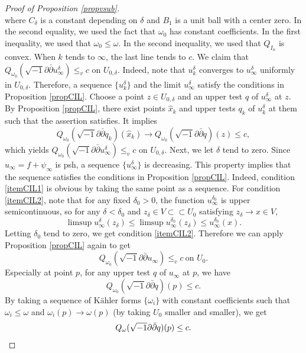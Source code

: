 \documentclass{amsart}
\numberwithin{equation}{section}
\theoremstyle{plain}
\theoremstyle{definition}
\theoremstyle{remark}
\newcommand{\delb}{\sqrt{-1}\partial\bar{\partial}}
\begin{document}
\begin{proof}[Proof of Proposition \ref{propvsub}]
\begin{equation}
    \end{equation}
    where $C_\delta$ is a constant depending on $\delta$ and $B_1$ is a unit ball with a center zero. In the second equality, we used the fact that $\omega_0$ has constant coefficients. In the first inequality, we used that $\omega_0\le \omega$. In the second inequality, we used that $Q_{I_n}$ is convex. When $k$ tends to $\infty$, the last line tends to $c$. We claim that $Q_{\omega_0}(\delb u^\delta_\infty)\le_v c$ on $U_{0,\delta}$. Indeed, note that $u^\delta_k$ converges to $u^\delta_\infty$ uniformly in $U_{0,\delta}$. Therefore, a sequence $\{ u^\delta_k\}$ and the limit $u^\delta_\infty$ satisfy the conditions in Proposition \ref{propCIL}. Choose a point $z \in U_{0,\delta}$ and an upper test $q$ of $u^\delta_\infty$ at $z$. By Proposition \ref{propCIL}, there exist points $\hat{x}_k$ and upper tests $q_k$ of $u^\delta_k$ at them such that the assertion satisfies. It implies 
    $$Q_{\omega_0}(\delb q_k)(\hat{x}_k) \rightarrow Q_{\omega_0}(\delb q)(z) \le c,$$
    which yields $Q_{\omega_0}(\delb u^\delta_\infty)\le_v c$ on $U_{0,\delta}$.
    Next, we let $\delta$ tend to zero. Since $u_\infty = f + \psi_\infty$ is psh, a sequence $\{ u^\delta_\infty \}$ is decreasing. This property implies that the sequence satisfies the conditions in Proposition \ref{propCIL}. 
    Indeed, condition \ref{itemCIL1} is obvious by taking the same point as a sequence. For condition \ref{itemCIL2}, note that for any fixed $\delta_0>0$, the function $u^{\delta_0}_\infty$ is upper semicontinuous, so for any $\delta < \delta_0$ and $z_\delta \in V \subset\subset U_0$ satisfying $z_\delta \rightarrow x \in V$,
    $$\limsup{u^\delta_\infty}(z_\delta)\le \limsup{u^{\delta_0}_\infty}(z_\delta) \le u^{\delta_0}_\infty(x).$$
    Letting $\delta_0$ tend to zero, we get condition \ref{itemCIL2}. Therefore we can apply Proposition \ref{propCIL} again to get
    $$Q_{\omega_0}(\delb u_\infty) \le_v c \ \text{on $U_0$}.$$
    Especially at point $p$, for any upper test $q$ of $u_\infty$ at $p$, we have
    $$Q_{\omega_0}(\delb q)(p) \le c.$$
    By taking a sequence of K{\"a}hler forms $\{\omega_i\}$ with constant coefficients such that $\omega_i \le \omega$ and $\omega_i(p) \rightarrow \omega(p)$ (by taking $U_0$ smaller and smaller), we get
    \[Q_\omega(\delb q)(p) \le c. \qedhere \]
\end{proof}
\end{document}
